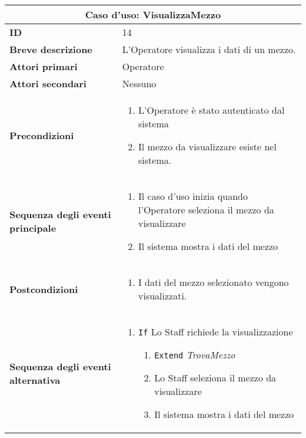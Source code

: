 \documentclass[a4paper]{report}
\begin{document}
\clearpage
\begin{table}[H]
\vspace*{-0cm}
\renewcommand{\arraystretch}{1.9}
\begin{tabular}{|p{3.9cm}|p{9.9cm}|}
\hline
\multicolumn{2}{|c|}{\textbf{Caso d’uso: VisualizzaMezzo}} \\ \hline
	\textbf{ID} & 14 \\ \hline
	\textbf{Breve descrizione} & L'Operatore visualizza i dati di un mezzo. \\ \hline
	\textbf{Attori primari} & Operatore \\ \hline
	\textbf{Attori secondari} & Nessuno \\ \hline
	\textbf{Precondizioni} & \begin{enumerate}[label=\arabic*.,leftmargin=14pt,labelsep=0.5em,topsep=0pt,partopsep=0pt,parsep=0pt,itemsep=0pt]
        \item L’Operatore è stato autenticato dal sistema
        \item Il mezzo da visualizzare esiste nel sistema.
    \end{enumerate} \\ \hline
    	\textbf{Sequenza degli eventi principale} & \begin{enumerate}[label=\arabic*.,leftmargin=14pt,labelsep=0.5em,topsep=0pt,partopsep=0pt,parsep=0pt,itemsep=0pt]
        \item Il caso d'uso inizia quando l'Operatore seleziona il mezzo da visualizzare
        \item Il sistema mostra i dati del mezzo 
    \end{enumerate}\\ \hline
    	\textbf{Postcondizioni} & \begin{enumerate}[label=\arabic*.,leftmargin=14pt,labelsep=0.5em,topsep=0pt,partopsep=0pt,parsep=0pt,itemsep=0pt]
        \item I dati del mezzo selezionato vengono visualizzati.
    \end{enumerate}\\ \hline
    	\textbf{Sequenza degli eventi alternativa} & \begin{enumerate}[leftmargin=14pt,label=\arabic*.,labelsep=0.5em,topsep=0pt,partopsep=0pt,parsep=0pt,itemsep=0pt]
        \item \texttt{If} Lo Staff richiede la visualizzazione
        \begin{enumerate}[label=\arabic{enumi}.\arabic*.,leftmargin=22pt,labelsep=0.5em,topsep=0pt,partopsep=0pt,parsep=0pt,itemsep=0pt]
            \item[] \texttt{Extend} \textit{TrovaMezzo}
            \item Lo Staff seleziona il mezzo da visualizzare
            \item Il sistema mostra i dati del mezzo 
        \end{enumerate}
    \end{enumerate} \\ \hline
\end{tabular}
\end{table}
\end{document}
